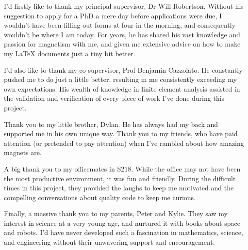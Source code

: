 I'd firstly like to thank my principal supervisor, Dr Will Robertson. Without his suggestion to apply for a PhD a mere day before applications were due, I wouldn't have been filling out forms at four in the morning, and consequently wouldn't be where I am today. For years, he has shared his vast knowledge and passion for magnetism with me, and given me extensive advice on how to make my \LaTeX{} documents just a tiny bit better.

I'd also like to thank my co-supervisor, Prof Benjamin Cazzolato. He constantly pushed me to do just a little better, resulting in me consistently exceeding my own expectations. His wealth of knowledge in finite element analysis assisted in the validation and verification of every piece of work I've done during this project.

Thank you to my little brother, Dylan. He has always had my back and supported me in his own unique way. Thank you to my friends, who have paid attention (or pretended to pay attention) when I've rambled about how amazing magnets are.

A big thank you to my officemates in S218. While the office may not have been the most productive environment, it was fun and friendly. During the difficult times in this project, they provided the laughs to keep me motivated and the compelling conversations about quality code to keep me curious.

Finally, a massive thank you to my parents, Peter and Kylie. They saw my interest in science at a very young age, and nurtured it with books about space and robots. I'd have never developed such a fascination in mathematics, science, and engineering without their unwavering support and encouragement.




